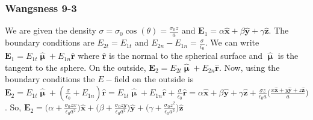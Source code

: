 \documentclass[crop=false,class=article,oneside]{standalone}
\begin{document}
        \subsubsection{Wangsness 9-3}
        We are given the density $\sigma = \sigma_0 \cos(\theta) = \frac{\sigma_0 z}{a}$ and $\mathbf{E}_1 = \alpha \hat{\mathbf{x}}+\beta \hat{\mathbf{y}}+ \gamma \hat{\mathbf{z}}$. The boundary conditions are $E_{2t} = E_{1t}$ and $E_{2n}-E_{1n} = \frac{\sigma}{\epsilon_0}$. We can write $\mathbf{E}_1 = E_{1t}\hat{\boldsymbol{\upmu}}+E_{1n} \hat{\mathbf{r}}$ where $\hat{\mathbf{r}}$ is the normal to the spherical surface and $\hat{\boldsymbol{\upmu}}$ is the tangent to the sphere. On the outside, $\mathbf{E}_2 = E_{2t}\hat{\boldsymbol{\upmu}}+E_{2n}\hat{\mathbf{r}}$. Now, using the boundary conditions the $E-$field on the outside is $\mathbf{E}_2 = E_{1t}\hat{\boldsymbol{\upmu}}+(\frac{\sigma}{\epsilon_0}+E_{1n})\hat{\mathbf{r}} = E_{1t}\hat{\boldsymbol{\upmu}}+E_{1n}\hat{\mathbf{r}}+\frac{\sigma}{\epsilon_0}\hat{\mathbf{r}} = \alpha \hat{\mathbf{x}}+\beta \hat{\mathbf{y}}+\gamma \hat{\mathbf{z}} + \frac{\sigma z}{\epsilon_0 a}\bigg(\frac{x\hat{\mathbf{x}}+y\hat{\mathbf{y}}+z\hat{\mathbf{z}}}{a}\bigg)$. So, $\mathbf{E}_2 = \big(\alpha+\frac{\sigma_0 zx}{\epsilon_0 a^2}\big)\hat{\mathbf{x}}+\big(\beta + \frac{\sigma_0 zy}{\epsilon_0 a^2}\big)\hat{\mathbf{y}}+\big(\gamma+ \frac{\sigma_0 z^2}{\epsilon_0 a^2}\big)\hat{\mathbf{z}}$
\end{document}
